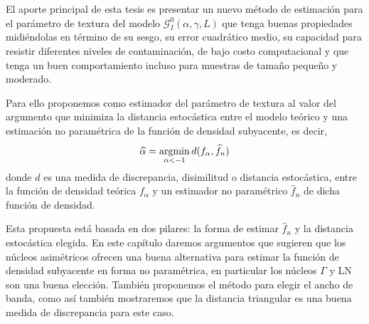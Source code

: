 

El aporte principal de esta tesis es presentar un nuevo método de estimación para el parámetro de textura del modelo $\mathcal{G}_I^0(\alpha,\gamma,L)$ que tenga  buenas propiedades midiéndolas en término de su sesgo, su error cuadrático medio, su capacidad para resistir diferentes niveles de contaminación, de bajo costo computacional y que tenga un buen comportamiento incluso para muestras de tamaño pequeño y moderado. 

Para ello proponemos como estimador del parámetro de textura al valor del argumento que minimiza la distancia estocástica entre el modelo teórico y una estimación no paramétrica de la función de densidad subyacente, es decir,
\begin{align}
\label{PropuestaMDE}
\widehat{\alpha}=\mathop{\rm argmin} \limits_{\alpha<-1} d(f_{\alpha}, \widehat{f}_n)
\end{align}
donde $d$ es una medida de discrepancia, disimilitud o distancia estocástica, entre la función de densidad teórica $f_{\alpha}$ y un estimador no paramétrico $\widehat{f}_n$ de dicha función de densidad.

Esta propuesta está basada en dos pilares: la forma de estimar $\widehat{f}_n$ y la distancia estocástica elegida. En este capítulo daremos argumentos que sugieren que los núcleos asimétricos ofrecen una buena alternativa para estimar la función de densidad subyacente en forma no paramétrica, en particular los núcleos $\Gamma$ y LN son una buena elección. También proponemos el método para elegir el ancho de banda, como así también mostraremos que la distancia triangular es una buena medida de discrepancia para este caso.

